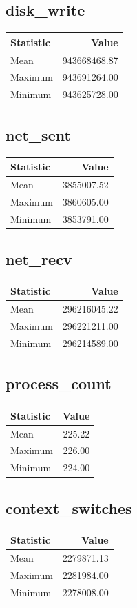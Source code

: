 \documentclass[11pt]{article}
\begin{document}
\subsection{disk_write}
\begin{tabular}{lr}
\toprule
Statistic & Value \\
\midrule
Mean & 943668468.87 \\
Maximum & 943691264.00 \\
Minimum & 943625728.00 \\
\bottomrule
\end{tabular}


\subsection{net_sent}
\begin{tabular}{lr}
\toprule
Statistic & Value \\
\midrule
Mean & 3855007.52 \\
Maximum & 3860605.00 \\
Minimum & 3853791.00 \\
\bottomrule
\end{tabular}


\subsection{net_recv}
\begin{tabular}{lr}
\toprule
Statistic & Value \\
\midrule
Mean & 296216045.22 \\
Maximum & 296221211.00 \\
Minimum & 296214589.00 \\
\bottomrule
\end{tabular}


\subsection{process_count}
\begin{tabular}{lr}
\toprule
Statistic & Value \\
\midrule
Mean & 225.22 \\
Maximum & 226.00 \\
Minimum & 224.00 \\
\bottomrule
\end{tabular}


\subsection{context_switches}
\begin{tabular}{lr}
\toprule
Statistic & Value \\
\midrule
Mean & 2279871.13 \\
Maximum & 2281984.00 \\
Minimum & 2278008.00 \\
\bottomrule
\end{tabular}
\end{document}
